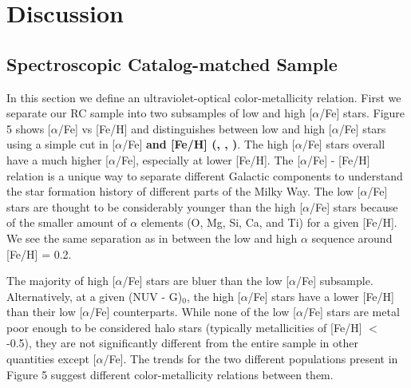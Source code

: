 \documentclass[twocolumn]{emulateapj}
\begin{document}
\section{Discussion}
\subsection{Spectroscopic Catalog-matched Sample}
In this section we define an ultraviolet-optical color-metallicity relation. First we separate our RC sample into two subsamples of low and high [$\alpha$/Fe] stars. Figure 5 shows [$\alpha$/Fe] vs [Fe/H] and distinguishes between low and high [$\alpha$/Fe] stars using a simple cut in [$\alpha$/Fe] \textbf{and [Fe/H] (\citealt{hawkins15}, \citealt{nidever14}, \citealt{li18})}. The high [$\alpha$/Fe] stars overall have a much higher [$\alpha$/Fe], especially at lower [Fe/H]. The [$\alpha$/Fe] - [Fe/H] relation is a unique way to separate different Galactic components to understand the star formation history of different parts of the Milky Way. The low [$\alpha$/Fe] stars are thought to be considerably younger than the high [$\alpha$/Fe] stars because of the smaller amount of $\alpha$ elements (O, Mg, Si, Ca, and Ti) for a given [Fe/H]. We see the same separation as in \citealt{nidever14} between the low and high $\alpha$ sequence around [Fe/H] = 0.2. 

The majority of high [$\alpha$/Fe] stars are bluer than the low [$\alpha$/Fe] subsample. Alternatively, at a given (NUV - G)$_0$, the high [$\alpha$/Fe] stars have a lower [Fe/H] than their low [$\alpha$/Fe] counterparts. While none of the low [$\alpha$/Fe] stars are metal poor enough to be considered halo stars (typically metallicities of [Fe/H] $<$ -0.5), they are not significantly different from the entire sample in other quantities except [$\alpha$/Fe]. The trends for the two different populations present in Figure 5 suggest different color-metallicity relations between them. 
\end{document}
